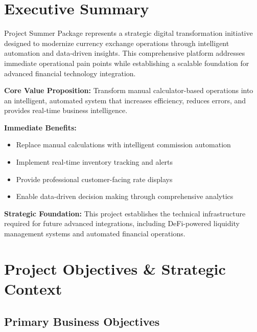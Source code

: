 \documentclass[11pt, letterpaper]{article}
\begin{document}
\section*{Executive Summary}

Project Summer Package represents a strategic digital transformation initiative designed to modernize currency exchange operations through intelligent automation and data-driven insights. This comprehensive platform addresses immediate operational pain points while establishing a scalable foundation for advanced financial technology integration.

\textbf{Core Value Proposition:} Transform manual calculator-based operations into an intelligent, automated system that increases efficiency, reduces errors, and provides real-time business intelligence.

\textbf{Immediate Benefits:}
\begin{itemize}[leftmargin=*]
    \item Replace manual calculations with intelligent commission automation
    \item Implement real-time inventory tracking and alerts
    \item Provide professional customer-facing rate displays
    \item Enable data-driven decision making through comprehensive analytics
\end{itemize}

\textbf{Strategic Foundation:} This project establishes the technical infrastructure required for future advanced integrations, including DeFi-powered liquidity management systems and automated financial operations.

\newpage

\section{Project Objectives \& Strategic Context}

\subsection{Primary Business Objectives}
\end{document}
